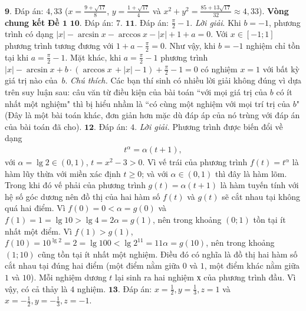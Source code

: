 \begin{multicols}{2}
	\vskip 0.1cm
	$\pmb{9.}$ Đáp án: $4{,}33$ ($x = \frac{9 + \sqrt{17}}{8}$, $y = \frac{1+ \sqrt{17}}{4}$ và  $x^2 + y^2 = \frac{85 + 13\sqrt{17}}{32} \approx 4{,}33$).
	\vskip 0.1cm
	\textbf{\color{cackithi}Vòng chung kết}
	\vskip 0.1cm
	\textbf{\color{cackithi}Đề $\pmb{1}$}
	\vskip 0.1cm
	$\pmb{10.}$ Đáp án: $7$.
	\vskip 0.1cm 
	$\pmb{11.}$ Đáp án:  $\frac{\pi}{2} -1$.
	\vskip 0.1cm 
	\textit{Lời giải}. Khi  $b = -1$, phương trình có dạng $|x| - \arcsin x - \arccos x - |x| + 1 + a = 0$. Với $x \in [-1;1]$ phương trình tương đương với $1 + a - \frac{\pi}{2} = 0$. Như vậy, khi $b = -1$  nghiệm chỉ tồn tại khi $a = \frac{\pi}{2} - 1$.
	\vskip 0.1cm
	Mặt khác, khi $a = \frac{\pi}{2} -1$ phương trình $|x| - \arcsin x + b \cdot (\arccos x\, + |x| - 1) + \frac{\pi }{2} - 1 = 0$ có nghiệm $x =1$ với bất kỳ giá trị nào của~$b$.
	\vskip 0.1cm
	\textit{Chú thích.} Các bạn thí sinh có nhiều lời giải không đúng vì dựa trên suy luận sau: câu văn từ điều kiện của bài toán ``với mọi giá trị của $b$ có ít nhất một nghiệm" thì bị hiểu nhầm là ``có cùng một nghiệm với mọi trí trị của $b$" (Đây là một bài toán khác, đơn giản hơn mặc dù đáp áp của nó trùng với đáp án của bài toán đã cho). 
	\vskip 0.1cm
	$\pmb{12.}$ Đáp án: $4$.
	\vskip 0.1cm 
	\textit{Lời giải.} Phương trình được biến đổi về dạng 
	\begin{align*}
		{t^\alpha } = \alpha (t + 1),
	\end{align*}
	với $\alpha  = \lg 2 \in (0,1)$, $t = {x^2} - 3 > 0$.
	\vskip 0.1cm
	Vì vế trái của phương trình $f\left( t \right) = {t^\alpha }$ là hàm lũy thừa với miền xác định $t \ge 0$; và với $\alpha \in  (0,1)$ thì đây là hàm lõm. Trong khi đó vế phải của phương trình $g(t) = \alpha(t+1)$ là hàm tuyến tính với hệ số góc dương nên đồ thị của hai hàm số $f(t)$ và $g(t)$ sẽ cắt nhau tại không quá hai điểm.
	\vskip 0.1cm
	Vì $f\left( 0 \right) = 0 < \alpha  = g\left( 0 \right)$ và  $f\left( 1 \right) = 1 = \lg 10 > \lg 4 = 2\alpha  = g\left( 1 \right)$, nên trong khoảng $(0;1)$ tồn tại ít nhất một điểm.
	\vskip 0.1cm
	Vì $f(1) > g(1)$, $f\left( {10} \right) = {10^{\lg 2}} = 2 = \lg 100 < \lg {2^{11}} = 11\alpha  = g\left( {10} \right)$, nên trong khoảng $(1;10)$ cũng tồn tại ít nhất một nghiệm.
	\vskip 0.1cm
	Điều đó có nghĩa là đồ thị hai hàm số cắt nhau tại đúng hai điểm (một điểm nằm giữa $0$ và $1$, một điểm khác nằm giữa $1$ và $10$).
	\vskip 0.1cm 
	Mỗi nghiệm dương $t$ lại sinh ra hai nghiệm $х$ của phương trình đầu. Vì vậy, có cả thảy là $4$ nghiệm.
	\vskip 0.1cm
	$\pmb{13.}$ Đáp án:  $x = \frac{1}{2}, y = \frac{1}{3}, z= 1$  và  $x = -\frac{1}{2}, y = - \frac{1}{3}  , z= -1$.

\end{multicols}
